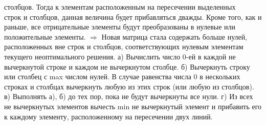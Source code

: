 \documentclass[17pt]{extarticle}
\begin{document}
\begin{enumerate}
          столбцов.
          \subitem Тогда к элементам расположенным на пересечении выделенных \\
          строк и столбцов, данная величина будет прибавляться дважды.
          Кроме того, как и раньше, все отрицательные элементы будут
          преобразованы в нулевые или положительные элементы.
          \subitem $\Rightarrow$ Новая матрица стала содержать больше нулей, расположенных
          вне строк и столбцов, соответствующих нулевым элементам
          текущего неоптимального решения.
          \subitem а) Вычислить число 0-ей в каждой не вычеркнутой строке и каждом не вычеркнутом столбце.
          \subitem б) Вычеркнуть строку или столбец с max числом нулей. В
          случае равенства числа 0 в нескольких строках и столбцах
          вычеркнуть любую из этих строк (или любую из столбцов).
          \subitem в) Выполнять а), б) до тех пор, пока не будут вычеркнуты все нули.
          \subitem г) Из всех не вычеркнутых элементов вычесть min не
          вычеркнутый элемент и прибавить его к каждому элементу,
          расположенному на пересечении двух линий.
\end{enumerate}
\end{document}
